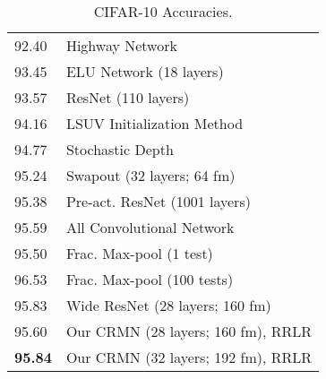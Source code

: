 \documentclass{article}
\begin{document}
\begin{table}[!htb]
\begin{minipage}{.5\linewidth}
\begin{tabular}{ |p{.5cm} p{5.5cm}|}
    92.40  & Highway Network \cite{srivastava2015training} \\ 
    93.45 & ELU Network \cite{clevert2015fast} (18 layers) \\ \hline
    93.57 & ResNet (110 layers) \cite{he2015deep} \\ 
94.16 & LSUV Initialization Method \cite{DBLP:journals/corr/MishkinM15} \\  \hline
94.77 & Stochastic Depth \cite{huang2016deep} \\
95.24 & Swapout \cite{singhHF2016swapout} (32 layers; 64 fm) \\ \hline
95.38 & Pre-act. ResNet \cite{he2016identity} (1001 layers) \\ 
95.59 & All Convolutional Network \cite{springenberg2014striving}  \\ \hline
95.50 & Frac. Max-pool \cite{graham2014fractional} (1 test) \\
96.53 & Frac. Max-pool  \cite{graham2014fractional} (100 tests) \\ \hline
95.83 & Wide ResNet
\cite{zagoruyko2016wide} (28 layers; 160 fm) \\ \hline \hline
     95.60 & Our CRMN (28 layers; 160 fm), RRLR  \\
     \textbf{95.84} & Our CRMN (32 layers; 192 fm), RRLR  \\ \hline
    \end{tabular}
\caption{CIFAR-10 Accuracies.}
\label{tab:cifar10}
 \end{minipage}%
%
\end{table}
\end{document}
